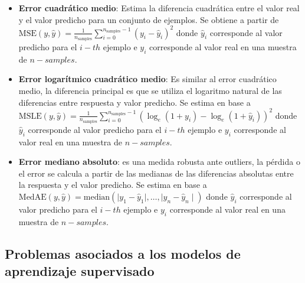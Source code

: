 \begin{itemize}
	\item \textbf{Error cuadrático medio}: Estima la diferencia cuadrática entre el valor real y el valor predicho para un conjunto de ejemplos. Se obtiene a partir de $\text{MSE}(y, \hat{y}) = \frac{1}{n_\text{samples}} \sum_{i=0}^{n_\text{samples} - 1} (y_i - \hat{y}_i)^2$ donde $\hat{y}_i$ corresponde al valor predicho para el $i-th$ ejemplo e $y_{i}$ corresponde al valor real en una muestra de $n-samples$.
	
	\item \textbf{Error logarítmico cuadrático medio}: Es similar al error cuadrático medio, la diferencia principal es que se utiliza el logaritmo natural de las diferencias entre respuesta y valor predicho. Se estima en base a $\text{MSLE}(y, \hat{y}) = \frac{1}{n_\text{samples}} \sum_{i=0}^{n_\text{samples} - 1} (\log_e (1 + y_i) - \log_e (1 + \hat{y}_i) )^2$ donde $\hat{y}_i$ corresponde al valor predicho para el $i-th$ ejemplo e $y_{i}$ corresponde al valor real en una muestra de $n-samples$.
	
	\item \textbf{Error mediano absoluto}: es una medida robusta ante outliers, la pérdida o el error se calcula a partir de las medianas de las diferencias absolutas entre la respuesta y el valor predicho. Se estima en base a $\text{MedAE}(y, \hat{y}) = \text{median}(\mid y_1 - \hat{y}_1 \mid, \ldots, \mid y_n - \hat{y}_n \mid)$ donde $\hat{y}_i$ corresponde al valor predicho para el $i-th$ ejemplo e $y_{i}$ corresponde al valor real en una muestra de $n-samples$.
	  
	
\end{itemize}

\subsection{Problemas asociados a los modelos de aprendizaje supervisado}

